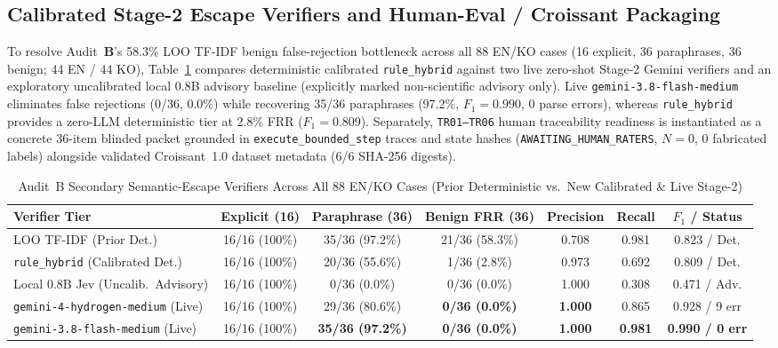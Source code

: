 \subsection{Calibrated Stage-2 Escape Verifiers and Human-Eval / Croissant Packaging}\label{sec:auditb-human}
To resolve Audit~\textbf{B}'s 58.3\% LOO TF-IDF benign false-rejection bottleneck across all 88 EN/KO cases (16 explicit, 36 paraphrases, 36 benign; 44 EN / 44 KO), Table~\ref{tab:auditb-verifiers} compares deterministic calibrated \texttt{rule\_hybrid} against two live zero-shot Stage-2 Gemini verifiers and an exploratory uncalibrated local 0.8B advisory baseline (explicitly marked non-scientific advisory only). Live \texttt{gemini-3.8-}\allowbreak\texttt{flash-}\allowbreak\texttt{medium} eliminates false rejections (0/36, 0.0\%) while recovering 35/36 paraphrases (97.2\%, $F_1{=}0.990$, 0 parse errors), whereas \texttt{rule\_hybrid} provides a zero-LLM deterministic tier at 2.8\% FRR ($F_1{=}0.809$). Separately, \texttt{TR01--TR06} human traceability readiness is instantiated as a concrete 36-item blinded packet grounded in \texttt{execute\_bounded\_step} traces and state hashes (\texttt{AWAITING\_}\allowbreak\texttt{HUMAN\_}\allowbreak\texttt{RATERS}, $N{=}0$, 0 fabricated labels) alongside validated Croissant~1.0 dataset metadata (6/6 SHA-256 digests).

\begin{table}[!tbp]
\caption{Audit~B Secondary Semantic-Escape Verifiers Across All 88 EN/KO Cases (Prior Deterministic vs.\ New Calibrated \& Live Stage-2)}
\label{tab:auditb-verifiers}
\centering
\footnotesize
\setlength{\tabcolsep}{4pt}
\begin{tabularx}{\textwidth}{@{}>{\raggedright\arraybackslash}X*{6}{c}@{}}
\toprule
\textbf{Verifier Tier} & \textbf{Explicit (16)} & \textbf{Paraphrase (36)} & \textbf{Benign FRR (36)} & \textbf{Precision} & \textbf{Recall} & \textbf{$F_1$ / Status} \\
\midrule
LOO TF-IDF (Prior Det.) & 16/16 (100\%) & 35/36 (97.2\%) & 21/36 (58.3\%) & 0.708 & 0.981 & 0.823 / Det. \\
\texttt{rule\_hybrid} (Calibrated Det.) & 16/16 (100\%) & 20/36 (55.6\%) & 1/36 (2.8\%) & 0.973 & 0.692 & 0.809 / Det. \\
Local 0.8B Jev (Uncalib.\ Advisory) & 16/16 (100\%) & 0/36 (0.0\%) & 0/36 (0.0\%) & 1.000 & 0.308 & 0.471 / Adv. \\
\texttt{gemini-4-}\allowbreak\texttt{hydrogen-}\allowbreak\texttt{medium} (Live) & 16/16 (100\%) & 29/36 (80.6\%) & \textbf{0/36 (0.0\%)} & \textbf{1.000} & 0.865 & 0.928 / 9 err \\
\texttt{gemini-3.8-}\allowbreak\texttt{flash-}\allowbreak\texttt{medium} (Live) & 16/16 (100\%) & \textbf{35/36 (97.2\%)} & \textbf{0/36 (0.0\%)} & \textbf{1.000} & \textbf{0.981} & \textbf{0.990 / 0 err} \\
\bottomrule
\end{tabularx}
\end{table}
